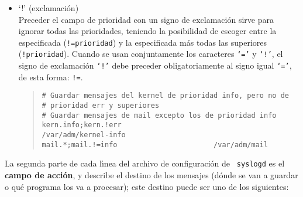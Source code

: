 \begin{itemize}
\begin{quote}
\end{quote}
\rm
\item{} `!' (exclamaci\'on)\\
Preceder el campo de prioridad con un signo de exclamaci\'on sirve para ignorar
todas las prioridades, teniendo la posibilidad de escoger entre la
especificada ({\tt !=prioridad}) y la especificada m\'as todas las superiores
({\tt !prioridad}). Cuando se usan conjuntamente los caracteres {\tt `='} y
{\tt `!'}, el signo de exclamaci\'on {\tt `!'} debe preceder obligatoriamente
al signo igual {\tt `='}, de esta forma: {\tt !=}.
\begin{quote}
\begin{verbatim}
# Guardar mensajes del kernel de prioridad info, pero no de
# prioridad err y superiores
# Guardar mensajes de mail excepto los de prioridad info
kern.info;kern.!err                           /var/adm/kernel-info
mail.*;mail.!=info                       /var/adm/mail
\end{verbatim}
\end{quote}
\end{itemize}
La segunda parte de cada l\'{\i}nea del archivo de configuraci\'on de {\tt 
syslogd} es el {\bf campo de acci\'on}, y describe el destino de los mensajes 
(d\'onde se van a guardar o qu\'e programa los va a procesar); este destino
puede ser uno de los siguientes:
